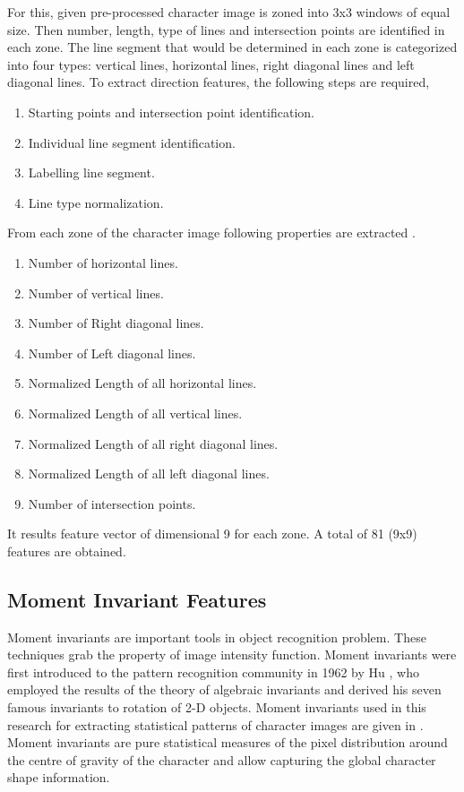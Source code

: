 For this, given pre-processed character image is zoned into 3x3 windows of equal size. Then number, length, type of lines and intersection points are identified in each zone. The line segment that would be determined in each zone is categorized into four types: vertical lines, horizontal lines, right diagonal lines and left diagonal lines. To extract direction features, the following steps are required,

\begin{enumerate}
\itemsep0em
\item Starting points and intersection point identification.
\item Individual line segment identification.
\item Labelling line segment.
\item Line type normalization.
\end{enumerate}

From each zone of the character image following properties are extracted \cite{Gaurav2012}.
\begin{enumerate}
\itemsep0em
\item Number of horizontal lines.
\item Number of vertical lines.
\item Number of Right diagonal lines.
\item Number of Left diagonal lines.
\item Normalized Length of all horizontal lines.
\item Normalized Length of all vertical lines.
\item Normalized Length of all right diagonal lines.
\item Normalized Length of all left diagonal lines.
\item Number of intersection points.
\end{enumerate}
It results feature vector of dimensional 9 for each zone. A total of 81 (9x9) features are obtained.

\subsection{Moment Invariant Features}
\label{section_moment_invariant_features}
Moment invariants are important tools in object recognition problem. These techniques grab the property of image intensity function. Moment invariants were first introduced to the pattern recognition community in 1962 by Hu \cite{Hu1962}, who employed the results of the theory of algebraic invariants and derived his seven famous invariants to rotation of 2-D objects. Moment invariants used in this research for extracting statistical patterns of character images are given in \cite{Gonzalez2008}. Moment invariants are pure statistical measures of the pixel distribution around the centre of gravity of the character and allow capturing the global character shape information.

